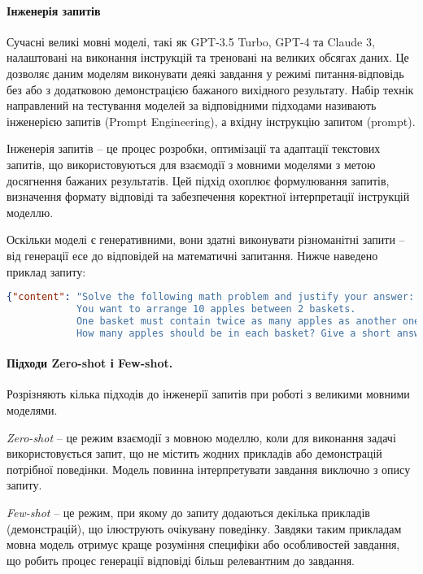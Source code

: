 \paragraph{Інженерія запитів} Сучасні великі мовні моделі, такі як GPT-3.5 Turbo, GPT-4 та Claude 3, налаштовані на виконання інструкцій та треновані на великих обсягах даних. Це дозволяє даним моделям виконувати деякі завдання у режимі питання-відповідь без або з додатковою демонстрацією бажаного вихідного результату. Набір технік направлений на тестування моделей за відповідними підходами називають інженерією запитів (Prompt Engineering), а вхідну інструкцію запитом (prompt).

Інженерія запитів -- це процес розробки, оптимізації та адаптації текстових запитів, що використовуються для взаємодії з мовними моделями з метою досягнення бажаних результатів. Цей підхід охоплює формулювання запитів, визначення формату відповіді та забезпечення коректної інтерпретації інструкцій моделлю.

Оскільки моделі є генеративними, вони здатні виконувати різноманітні запити -- від генерації есе до відповідей на математичні запитання. Нижче наведено приклад запиту:

\begin{lstlisting}[language=json, breaklines=true]
{"content": "Solve the following math problem and justify your answer:
            You want to arrange 10 apples between 2 baskets.
            One basket must contain twice as many apples as another one.
            How many apples should be in each basket? Give a short answer."}
\end{lstlisting}

\paragraph{Підходи Zero-shot і Few-shot.}
Розрізняють кілька підходів до інженерії запитів при роботі з великими мовними моделями.

\emph{Zero-shot} -- це режим взаємодії з мовною моделлю, коли для виконання задачі використовується запит, що не містить жодних прикладів або демонстрацій потрібної поведінки. Модель повинна інтерпретувати завдання виключно з опису запиту.

\emph{Few-shot} -- це режим, при якому до запиту додаються декілька прикладів (демонстрацій), що ілюструють очікувану поведінку. Завдяки таким прикладам мовна модель отримує краще розуміння специфіки або особливостей завдання, що робить процес генерації відповіді більш релевантним до завдання.

